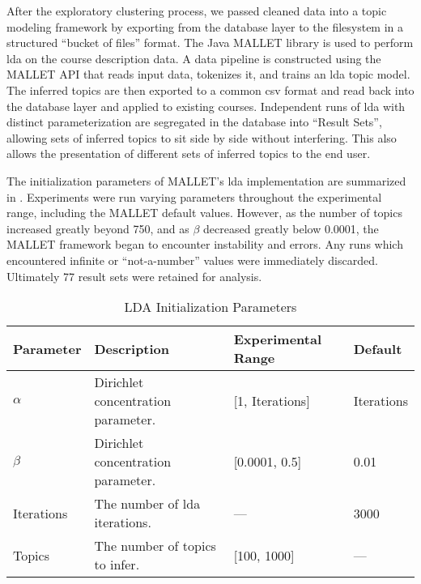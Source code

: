 After the exploratory clustering process, we pass\-ed clean\-ed data into a topic modeling framework by exporting from the database layer to the filesystem in a structured ``bucket of files'' format.
The Java MALLET library is used to perform \ac{lda} on the course description data.
A data pipeline is constructed using the MALLET API that reads input data, tokenizes it, and trains an \ac{lda} topic model.
The inferred topics are then exported to a common \ac{csv} format and read back into the database layer and applied to existing courses.
Independent runs of \ac{lda} with distinct parameterization are segregated in the database into ``Result Sets'', allowing sets of inferred topics to sit side by side without interfering.
This also allows the presentation of different sets of inferred topics to the end user.


The initialization parameters of MALLET's \ac{lda} implementation are summarized in .
Experiments were run varying parameters throughout the experimental range, including the MALLET default values.
However, as the number of topics increased greatly beyond 750, and as $\beta$ decreased greatly below 0.0001, the MALLET framework began to encounter instability and errors.
Any runs which encountered infinite or ``not-a-number'' values were immediately discarded.
Ultimately 77 result sets were retained for analysis.


\begin{table*}[ht]
\centering
\begin{tabular}{llll}
\toprule
Parameter  & Description & Experimental Range & Default \\
\midrule
$\alpha$   & Dirichlet concentration parameter. & [1, Iterations] & Iterations \\
$\beta$    & Dirichlet concentration parameter. & [0.0001, 0.5] & 0.01 \\
Iterations & The number of \ac{lda} iterations. & --- & 3000 \\
Topics     & The number of topics to infer. & [100, 1000] & --- \\
\bottomrule
\end{tabular}
\caption{LDA Initialization Parameters\label{table:lda-parameters}}
\end{table*}


